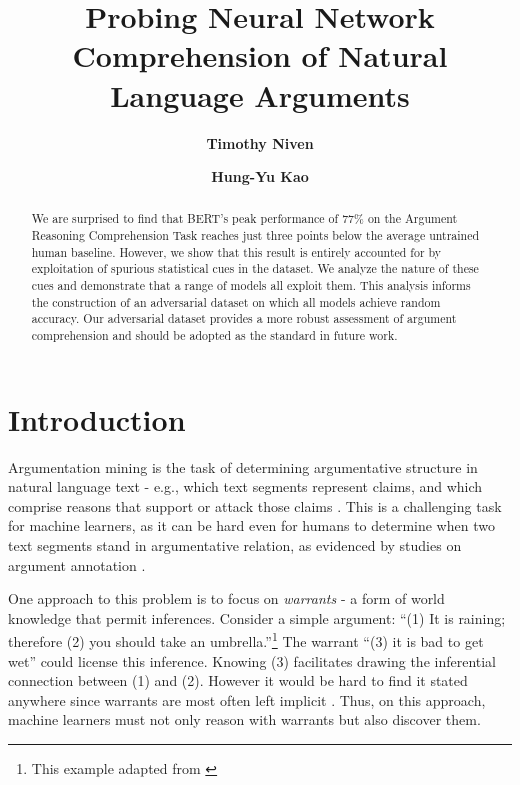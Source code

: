\documentclass[11pt,a4paper]{article}
\title{Probing Neural Network Comprehension of Natural Language Arguments}
\author{\textbf{Timothy Niven}}
\author{\textbf{Hung-Yu Kao}}
\affil{Intelligent Knowledge Management Lab \\
  Department of Computer Science and Information Engineering \\
  National Cheng Kung University \\
  Tainan, Taiwan \\
  \texttt{tim.niven.public@gmail.com}, \texttt{hykao@mail.ncku.edu.tw}}
\date{}
\begin{document}
\maketitle
\begin{abstract}
  We are surprised to find that BERT's peak performance of 77\% on the Argument Reasoning Comprehension Task reaches just three points below the average untrained human baseline. However, we show that this result is entirely accounted for by exploitation of spurious statistical cues in the dataset. We analyze the nature of these cues and demonstrate that a range of models all exploit them. This analysis informs the construction of an adversarial dataset on which all models achieve random accuracy. Our adversarial dataset provides a more robust assessment of argument comprehension and should be adopted as the standard in future work.
\end{abstract}

\section{Introduction}

Argumentation mining is the task of determining argumentative structure in natural language text - e.g., which text segments represent claims, and which comprise reasons that support or attack those claims \cite{MochalesM11, LippiT16}. This is a challenging task for machine learners, as it can be hard even for humans to determine when two text segments stand in argumentative relation, as evidenced by studies on argument annotation \cite{HabernalEG14}.

One approach to this problem is to focus on \textit{warrants} \cite{Toulmin58} - a form of world knowledge that permit inferences. Consider a simple argument: ``(1) It is raining; therefore (2) you should take an umbrella.''\footnote{This example adapted from \citeauthor{BlackH12} } The warrant ``(3) it is bad to get wet'' could license this inference. Knowing (3) facilitates drawing the inferential connection between (1) and (2). However it would be hard to find it stated anywhere since warrants are most often left implicit \cite{Walton05}. Thus, on this approach, machine learners must not only reason with warrants but also discover them.
\end{document}
